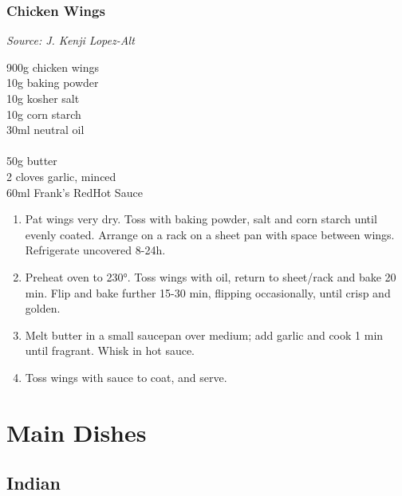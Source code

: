 \documentclass{report}
\begin{document}
\section{Chicken Wings}
\textit{Source: J. Kenji Lopez-Alt}\\
\begin{minipage}[t]{0.21\textwidth} \vspace{0pt} 
900g chicken wings\\
10g baking powder\\
10g kosher salt\\
10g corn starch\\
30ml neutral oil\\
\\
50g butter\\
2 cloves garlic, minced\\
60ml Frank's RedHot Sauce\\
\end{minipage}
\hfill
\begin{minipage}[t]{0.78\textwidth} \vspace{0pt}
	\begin{enumerate}
		\item Pat wings very dry. Toss with baking powder, salt and corn starch until evenly coated. Arrange on a rack on a sheet pan with space between wings. Refrigerate uncovered 8-24h.
		\item Preheat oven to 230°. Toss wings with oil, return to sheet/rack and bake 20 min. Flip and bake further 15-30 min, flipping occasionally, until crisp and golden.
		\item Melt butter in a small saucepan over medium; add garlic and cook 1 min until fragrant. Whisk in hot sauce.
		\item Toss wings with sauce to coat, and serve.
	\end{enumerate}	
\end{minipage}


\part{Main Dishes}

\chapter{Indian}
\end{document}
